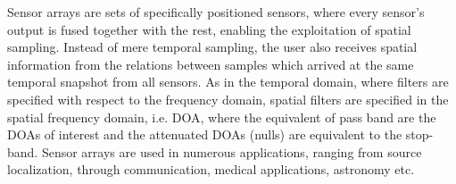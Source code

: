 Sensor arrays are sets of specifically positioned sensors, where every sensor's output is fused together with the rest, enabling the exploitation of spatial sampling.
Instead of mere temporal sampling, the user also receives spatial information from the relations between samples which arrived at the same temporal snapshot from all sensors. 
As in the temporal domain, where filters are specified with respect to the frequency domain, spatial filters are specified in the spatial frequency domain, i.e. DOA, where the equivalent of pass band are the DOAs of interest and the attenuated DOAs (nulls) are equivalent to the stop-band.
Sensor arrays are used in numerous applications, ranging from source localization, through communication, medical applications, astronomy etc.
\par 

